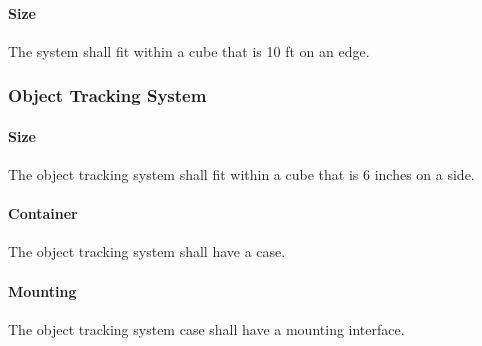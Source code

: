 \paragraph{Size}
The system shall fit within a cube that is 10 ft on an edge.

\subsubsection{Object Tracking System}

\paragraph{Size}
The object tracking system shall fit within a cube that is 6 inches on a side.

\paragraph{Container}
The object tracking system shall have a case. 

\paragraph{Mounting}
The object tracking system case shall have a mounting interface. 


